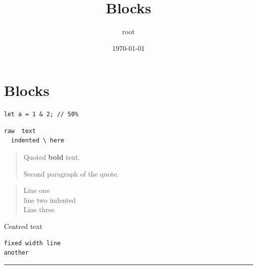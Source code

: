 \documentclass[11pt]{article}
\author{root}
\date{\today}
\title{Blocks}
\begin{document}
\maketitle
\tableofcontents

\section{Blocks}
\label{sec:org5f72315}
\begin{verbatim}
let a = 1 & 2; // 50%
\end{verbatim}

\begin{verbatim}
raw  text
  indented \ here
\end{verbatim}

\begin{quote}
Quoted \textbf{bold} text.

Second paragraph of the quote.
\end{quote}

\begin{verse}
Line one\\[0pt]
\hspace*{2em}line two indented\\[0pt]
Line three\\[0pt]
\end{verse}

\begin{center}
Centred text
\end{center}

\begin{verbatim}
fixed width line
another
\end{verbatim}


\noindent\rule{\textwidth}{0.5pt}

\newpage

\vspace{1em}
\end{document}
